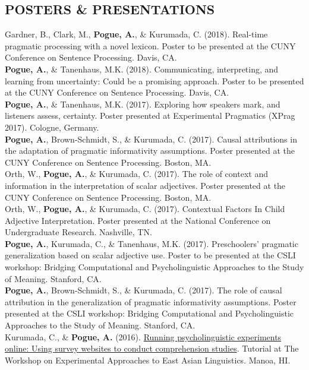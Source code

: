 \documentclass[margin, 7pt]{res} %
\begin{document}
\begin{resume}
 \section{POSTERS \& PRESENTATIONS}
Gardner, B., Clark, M., {\bf Pogue, A.}, \& Kurumada, C. (2018). Real-time pragmatic processing with a novel lexicon. Poster to be presented at the CUNY Conference on Sentence Processing. Davis, CA. \medskip \\
{\bf Pogue, A.}, \& Tanenhaus, M.K. (2018). Communicating, interpreting, and learning from uncertainty: Could be a promising approach. Poster to be presented at the CUNY Conference on Sentence Processing. Davis, CA. \medskip \\
{\bf Pogue, A.}, \& Tanenhaus, M.K. (2017). Exploring how speakers mark, and listeners assess, certainty. Poster presented at Experimental Pragmatics (XPrag 2017). Cologne, Germany. \medskip \\
{\bf Pogue, A.}, Brown-Schmidt, S., \& Kurumada, C. (2017). Causal attributions in the adaptation of pragmatic informativity assumptions. Poster presented at the CUNY Conference on Sentence Processing. Boston, MA. \medskip \\
Orth, W., {\bf Pogue, A.}, \& Kurumada, C. (2017). The role of context and information in the interpretation of scalar adjectives.  Poster presented at the CUNY Conference on Sentence Processing. Boston, MA. \medskip \\
Orth, W., {\bf Pogue, A.}, \& Kurumada, C. (2017). Contextual Factors In Child Adjective Interpretation. Poster presented at the National Conference on Undergraduate Research. Nashville, TN. \medskip \\
{\bf Pogue, A.}, Kurumada, C., \& Tanenhaus, M.K. (2017). Preschoolers' pragmatic generalization based on scalar adjective use. Poster to be presented at the CSLI workshop: Bridging Computational and Psycholinguistic Approaches to the Study of Meaning. Stanford, CA. \medskip \\
{\bf Pogue, A.}, Brown-Schmidt, S., \& Kurumada, C. (2017). The role of causal attribution in the generalization of pragmatic informativity assumptions. Poster presented at the CSLI workshop: Bridging Computational and Psycholinguistic Approaches to the Study of Meaning. Stanford, CA. \medskip \\
Kurumada, C., \& {\bf Pogue, A.} (2016). \href{http://amandapogue.github.io/Qualtrics_Tutorial/}{Running psycholinguistic experiments online: Using survey websites to conduct comprehension studies}. Tutorial at The Workshop on Experimental Approaches to East Asian Linguistics. Manoa, HI. \medskip \\

\end{resume}
\end{document}
